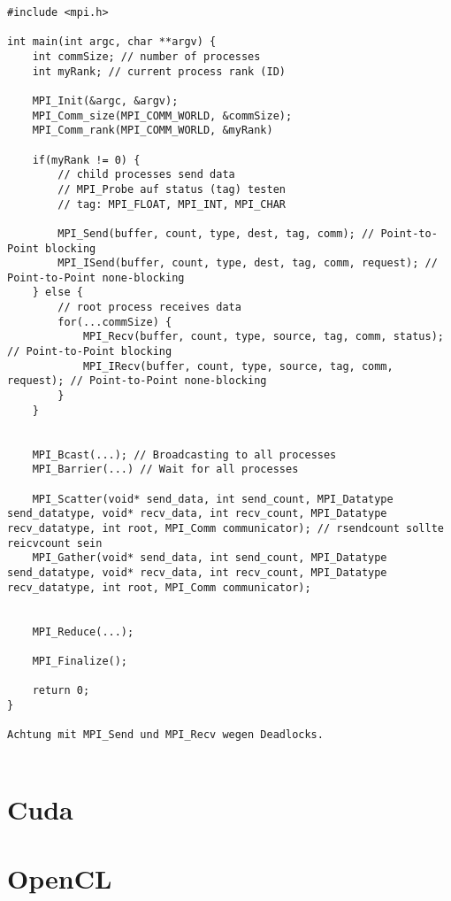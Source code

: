 \documentclass{article}
\begin{document}
\begin{listing}[H]
\begin{verbatim}
#include <mpi.h>

int main(int argc, char **argv) {
    int commSize; // number of processes
    int myRank; // current process rank (ID)

    MPI_Init(&argc, &argv);
    MPI_Comm_size(MPI_COMM_WORLD, &commSize);
    MPI_Comm_rank(MPI_COMM_WORLD, &myRank)
    
    if(myRank != 0) {
        // child processes send data
        // MPI_Probe auf status (tag) testen
        // tag: MPI_FLOAT, MPI_INT, MPI_CHAR
        
        MPI_Send(buffer, count, type, dest, tag, comm); // Point-to-Point blocking
        MPI_ISend(buffer, count, type, dest, tag, comm, request); // Point-to-Point none-blocking
    } else {
        // root process receives data
        for(...commSize) {
            MPI_Recv(buffer, count, type, source, tag, comm, status); // Point-to-Point blocking
            MPI_IRecv(buffer, count, type, source, tag, comm, request); // Point-to-Point none-blocking
        }
    }
    
    
    MPI_Bcast(...); // Broadcasting to all processes
    MPI_Barrier(...) // Wait for all processes
    
    MPI_Scatter(void* send_data, int send_count, MPI_Datatype send_datatype, void* recv_data, int recv_count, MPI_Datatype recv_datatype, int root, MPI_Comm communicator); // rsendcount sollte reicvcount sein
    MPI_Gather(void* send_data, int send_count, MPI_Datatype send_datatype, void* recv_data, int recv_count, MPI_Datatype recv_datatype, int root, MPI_Comm communicator);
    
    
    MPI_Reduce(...);
    
    MPI_Finalize();
    
    return 0;
}

Achtung mit MPI_Send und MPI_Recv wegen Deadlocks.


\end{verbatim}
\end{listing}

\section{Cuda}

\section{OpenCL}
\end{document}
